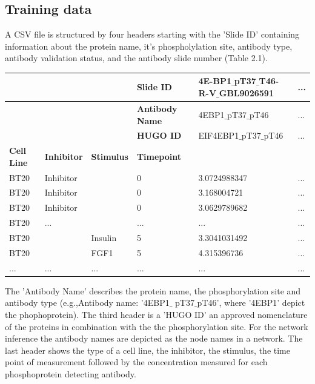 \subsection*{Training data}
A \gls{CSV} file is structured by four headers starting with the 'Slide ID' containing information about the protein name, it's phospholylation site, antibody type, antibody validation status, and the antibody slide number (Table 2.1).
\\
\begin{table}[H]
{\tabcolsep=3pt%
\begin{center}
\scriptsize
\begin{tabular}{llllll}
\toprule 
 & & & \textbf{Slide ID} & 4E-BP1$\_$pT37$\_$T46-R-V$\_$GBL9026591 & ... \\
\toprule
 & & & \textbf{Antibody Name} & 4EBP1$\_$pT37$\_$pT46 & ... \\
\toprule
 & & & \textbf{HUGO ID} & EIF4EBP1$\_$pT37$\_$pT46 & ... \\
\toprule
 \textbf{Cell Line} & \textbf{Inhibitor} & \textbf{Stimulus} & \textbf{Timepoint} & & \\
\hline
\rowcolor{black!10} BT20 & Inhibitor &   & 0 & 3.0724988347 & ...\\
 					BT20 & Inhibitor	& 	& 0 & 3.168004721 & ...\\
\rowcolor{black!10} BT20 & Inhibitor	&	& 0	& 3.0629789682	& ...\\
 					BT20 & ...	&	& ... & ...	& ...\\
\rowcolor{black!10} BT20 &	& Insulin	& 5	& 3.3041031492	&...\\
 					BT20 & 	& FGF1 &	5 & 4.315396736	& ...\\
\rowcolor{black!10} ... &	...	& ... &	...	& ...	& ... \\
\bottomrule
\end{tabular}
\end{center}
}
\end{table}

The 'Antibody Name' describes the protein name, the phosphorylation site and antibody type (e.g.,Antibody name: '4EBP1$\_$ pT37$\_$pT46', where '4EBP1' depict the phophoprotein). The third header is a 'HUGO ID' an approved nomenclature of the proteins in combination with the the phosphorylation site. For the network inference the antibody names are depicted as the node names in a network.
The last header shows the type of a cell line, the inhibitor, the stimulus, the time point of measurement followed by the concentration measured for each phosphoprotein detecting antibody.


